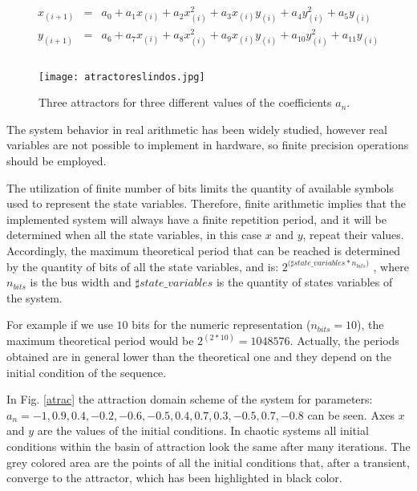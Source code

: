 \documentclass[conference]{IEEEtran}
\begin{document}
{ \small
\begin{eqnarray}\label{eq:Quad-map}
    x_{(i+1)}&=& a_0 + a_1 x_{(i)} + a_2 x_{(i)}^2 + a_3 x_{(i)} y_{(i)} + a_4 y_{(i)}^2 + a_5 y_{(i)} \nonumber\\
    y_{(i+1)}&=& a_6 + a_7 x_{(i)} + a_8 x_{(i)}^2 + a_9 x_{(i)} y_{(i)} + a_{10} y_{(i)}^2 + a_{11} y_{(i)}\nonumber\\
\\
\nonumber \end{eqnarray}

}

\begin{figure}
    \centering
    \texttt{[image: atractoreslindos.jpg]}\\
    \caption{Three attractors for three different values of the coefficients {$a_n$}.}\label{fig:atractores}
\end{figure}


The system behavior in real arithmetic has been widely studied, however
real variables are not possible to implement in hardware, so
finite precision operations should be employed.

The utilization of finite number of bits limits the quantity of
available symbols used to represent the state variables.
Therefore, finite arithmetic implies that the implemented system
will always have a finite repetition period, and it will be
determined when all the state variables, in this case $x$ and $y$,
repeat their values. Accordingly, the maximum theoretical period
that can be reached is determined by the quantity of bits of all
the state variables, and is: $2^{(\sharp
{state\_variables*n_{bits})}}$ , where $n_{bits}$ is the bus width
and $\sharp state\_variables$ is the quantity of states variables
of the system.

For example if we use $10$ bits for the numeric representation
($n_{bits} =10$), the maximum theoretical period would be
$2^{(2*10)} = 1048576$. Actually, the periods obtained are in
general lower than the theoretical one and they depend on the
initial condition of the sequence.

In Fig. \ref{atrac} the attraction domain scheme of the system for
parameters:
\small{$a_n={-1,0.9,0.4,-0.2,-0.6,-0.5,0.4,0.7,0.3,-0.5,0.7,-0.8}$}
can be seen. Axes $x$ and $y$ are the values of the initial
conditions. In chaotic systems all initial conditions within the
basin of attraction look the same after many iterations. The grey
colored area are the points of all the initial conditions that,
after a transient, converge to the attractor, which has been
highlighted in black color.
\end{document}
